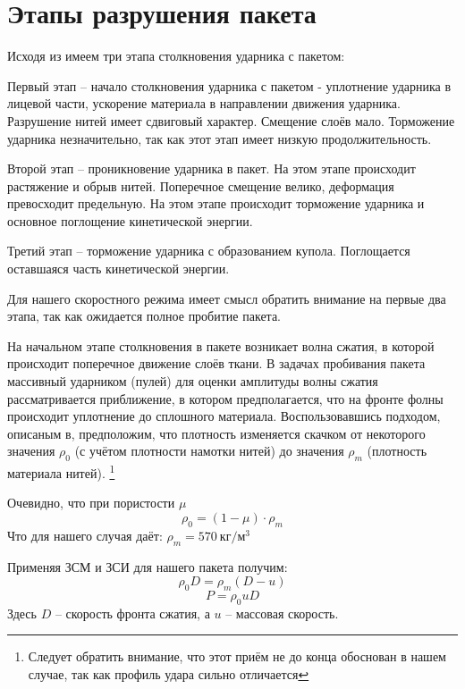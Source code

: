 \section{Этапы разрушения пакета}\label{sec:destr-stages}
Исходя из\cite{kobylkin2014} имеем три этапа столкновения ударника с пакетом:

Первый этап -- начало столкновения ударника с пакетом - уплотнение ударника в лицевой части,
ускорение материала в направлении движения ударника.
Разрушение нитей имеет сдвиговый характер.
Смещение слоёв мало.
Торможение ударника незначительно, так как этот этап имеет низкую продолжительность.

Второй этап -- проникновение ударника в пакет.
На этом этапе происходит растяжение и обрыв нитей.
Поперечное смещение велико, деформация превосходит предельную.
На этом этапе происходит торможение ударника и основное поглощение кинетической энергии.

Третий этап -- торможение ударника с образованием купола.
Поглощается оставшаяся часть кинетической энергии.

Для нашего скоростного режима имеет смысл обратить внимание на первые два этапа, так как ожидается полное пробитие пакета.

На начальном этапе столкновения в пакете возникает волна сжатия, в которой происходит поперечное движение слоёв ткани.
В задачах пробивания пакета массивный ударником (пулей) для оценки амплитуды волны сжатия рассматривается приближение,
в котором предполагается, что на фронте фолны происходит уплотнение до сплошного материала.
Воспользовавшись подходом, описаным в\cite{kobylkin2014}, предположим, что плотность изменяется скачком от некоторого
значения $\rho_0$ (с учётом плотности намотки нитей) до значения $\rho_m$ (плотность материала нитей).
\footnote{Следует обратить внимание, что этот приём не до конца обоснован в нашем случае, так как профиль удара сильно
отличается}

Очевидно, что при пористости $\mu$
\begin{equation}
    \rho_0 = (1 - \mu) \cdot \rho_m
\end{equation}
Что для нашего случая даёт: $\rho_m = 570~кг / м^3$

Применяя ЗСМ и ЗСИ для нашего пакета получим:
\begin{equation}
    \rho_0 D = \rho_m (D - u)
\end{equation}
\begin{equation}
    P = \rho_0 u D
\end{equation}
Здесь $D$ -- скорость фронта сжатия, а $u$ -- массовая скорость.

